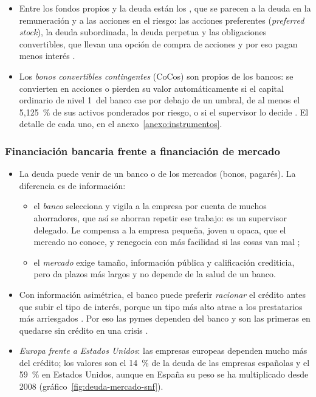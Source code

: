 \documentclass[11pt]{article}
\begin{document}
\begin{itemize}
\item Entre los fondos propios y la deuda están los , que se parecen a la deuda en la remuneración y a las acciones en el riesgo: las acciones preferentes (\emph{preferred stock}), la deuda subordinada, la deuda perpetua y las obligaciones convertibles, que llevan una opción de compra de acciones y por eso pagan menos interés .
\item Los \emph{bonos convertibles contingentes} (CoCos) son propios de los bancos: se convierten en acciones o pierden su valor automáticamente si el capital ordinario de nivel 1~del banco cae por debajo de un umbral, de al menos el 5,125~\% de sus activos ponderados por riesgo\nocite{UE2013CRR}, o si el supervisor lo decide . El detalle de cada uno, en el anexo~\ref{anexo:instrumentos}.
\end{itemize}

\subsubsection{Financiación bancaria frente a financiación de mercado}\label{sec:banco-mercado}

\begin{itemize}
\item La deuda puede venir de un banco o de los mercados (bonos, pagarés). La diferencia es de información:
  \begin{itemize}
  \item el \emph{banco} selecciona y vigila a la empresa por cuenta de muchos ahorradores, que así se ahorran repetir ese trabajo: es un supervisor delegado\nocite{Diamond1984Financial}. Le compensa a la empresa pequeña, joven u opaca, que el mercado no conoce, y renegocia con más facilidad si las cosas van mal ;
  \item el \emph{mercado} exige tamaño, información pública y calificación crediticia, pero da plazos más largos y no depende de la salud de un banco.
  \end{itemize}
\item Con información asimétrica, el banco puede preferir \emph{racionar} el crédito antes que subir el tipo de interés, porque un tipo más alto atrae a los prestatarios más arriesgados\nocite{StiglitzWeiss1981Credit} . Por eso las pymes dependen del banco y son las primeras en quedarse sin crédito en una crisis  .
\item \emph{Europa frente a Estados Unidos}: las empresas europeas dependen mucho más del crédito; los valores son el 14~\% de la deuda de las empresas españolas y el 59~\% en Estados Unidos, aunque en España su peso se ha multiplicado desde 2008 (gráfico~\ref{fig:deuda-mercado-snf}).
\end{itemize}
\end{document}
